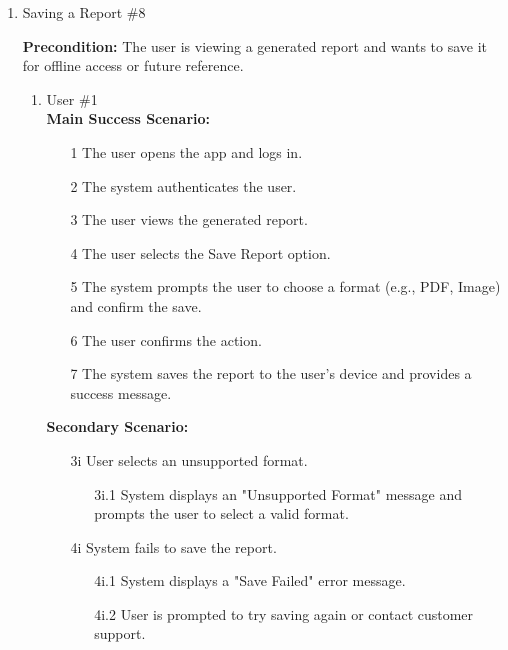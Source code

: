 \documentclass[]{article}
\begin{document}
\begin{enumerate}[{\bf BE1.}]
\item Saving a Report \#8

\textbf{Precondition:} The user is viewing a generated report and wants to save it for offline access or future reference.

\begin{enumerate}[{\bf VP1.}]
    \item User \#1 \\

        \textbf{Main Success Scenario:}
        \begin{enumerate}
            \item[1] The user opens the app and logs in.
            \item[2] The system authenticates the user.
            \item[3] The user views the generated report.
            \item[4] The user selects the Save Report option.
            \item[5] The system prompts the user to choose a format (e.g., PDF, Image) and confirm the save.
            \item[6] The user confirms the action.
            \item[7] The system saves the report to the user’s device and provides a success message.
        \end{enumerate}

        \textbf{Secondary Scenario:}
        \begin{enumerate}
            \item[3i] User selects an unsupported format.
            \begin{enumerate}
                \item[3i.1] System displays an "Unsupported Format" message and prompts the user to select a valid format.
            \end{enumerate}
            \item[4i] System fails to save the report.
            \begin{enumerate}
                \item[4i.1] System displays a "Save Failed" error message.
                \item[4i.2] User is prompted to try saving again or contact customer support.
            \end{enumerate}
        \end{enumerate}
\end{enumerate}


\end{enumerate}
\end{document}
